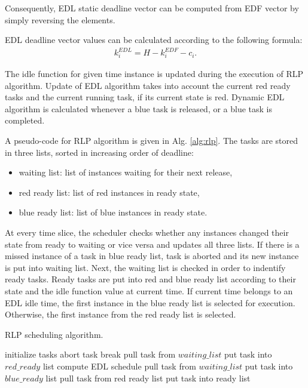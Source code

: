 Consequently, EDL static deadline vector can be computed from EDF vector by simply reversing the elements.

EDL deadline vector values can be calculated according to the following formula:
\begin{align}
k_i^{EDL} = H - k_i^{EDF} - c_i.
\end{align} 

The idle function for given time instance is updated during the execution of RLP algorithm. 
Update of EDL algorithm takes into account the current red ready tasks and the current running task, if its current state is red. 
Dynamic EDL algorithm is calculated whenever a blue task is released, or a blue task is completed. 

A pseudo-code for RLP algorithm is given in Alg. \ref{alg:rlp}.
The tasks are stored in three lists, sorted in increasing order of deadline: 
\begin{itemize}
	\item{waiting list: list of instances waiting for their next release,}
	\item{red ready list: list of red instances in ready state,}
	\item{blue ready list: list of blue instances in ready state.}
\end{itemize}
At every time slice, the scheduler checks whether any instances changed their state from ready to waiting or vice versa and updates all three lists. 
If there is a missed instance of a task in blue ready list, task is aborted and its new instance is put into waiting list. 
Next, the waiting list is checked in order to indentify ready tasks. 
Ready tasks are put into red and blue ready list according to their state and the idle function value at current time. 
If current time belongs to an EDL idle time, the first instance in the blue ready list is selected for execution. Otherwise, the first instance from the red ready list is selected.

\begin{algorithm} %
\caption{RLP scheduling algorithm.\label{alg:rlp}}
\begin{algorithmic}[1]
\State initialize tasks
\State abort task
\EndIf
\EndFor
{}
\State break
\EndIf
{}
\State pull task from $waiting\_list$
\State put task into $red\_ready$ list
\Else
{}
\State compute EDL schedule
\EndIf
{}
\State pull task from $waiting\_list$
\State put task into $blue\_ready$ list
\EndIf
\EndIf
\EndFor
{}
\State pull task from red ready list
\State put task into ready list
\EndFor
\EndIf
\end{algorithmic}
\end{algorithm}

